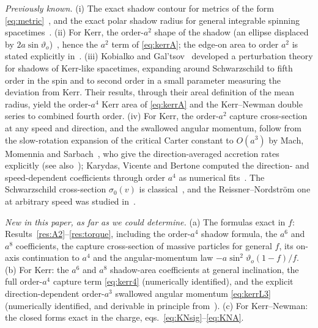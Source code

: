 \documentclass[11pt,a4paper]{article}
\theoremstyle{remark}
\numberwithin{equation}{section}
\begin{document}
\emph{Previously known.}
(i) The exact shadow contour for metrics of the form \eqref{eq:metric}~\cite{Tsukamoto2018,Shaikh2019},
and the exact polar shadow radius for general integrable spinning spacetimes~\cite{Salehi2024}.
(ii) For Kerr, the order-$a^2$ shape of the shadow (an ellipse displaced by $2a\sin\vartheta_o$)~\cite{Bozza2006,GrallaLupsasca2020shape,PerlickTsupko2022},
hence the $a^2$ term of \eqref{eq:kerrA}; the edge-on area to order $a^2$ is stated explicitly in~\cite{Hassanabadi2026}.
(iii) Kobialko and Gal'tsov~\cite{KobialkoGaltsov2026} developed a perturbation theory for shadows of Kerr-like spacetimes,
expanding around Schwarzschild to fifth order in the spin and to second order in a small parameter measuring the deviation from Kerr.
Their results, through their areal definition of the mean radius, yield the order-$a^4$ Kerr area of \eqref{eq:kerrA} and the
Kerr--Newman double series to combined fourth order.
(iv) For Kerr, the order-$a^2$ capture cross-section at any speed and direction, and the swallowed angular momentum, follow
from the slow-rotation expansion of the critical Carter constant to $O(a^3)$ by Mach, Momennia and Sarbach~\cite{MachMomenniaSarbach2026},
who give the direction-averaged accretion rates explicitly (see also~\cite{MachMomenniaSarbach2026b}); Karydas, Vicente and Bertone
computed the direction- and speed-dependent coefficients through order $a^4$ as numerical fits~\cite{Karydas2026}. The
Schwarzschild cross-section $\sigma_0(v)$ is classical~\cite{Unruh1976}, and the Reissner--Nordstr\"om one at arbitrary speed was
studied in~\cite{Benone2014}.

\emph{New in this paper, as far as we could determine.}
(a) The formulas exact in $f$: Results~\ref{res:A2}--\ref{res:torque}, including the order-$a^4$ shadow formula, the
$a^6$ and $a^8$ coefficients, the capture cross-section of massive particles for general $f$, its on-axis continuation to
$a^4$ and the angular-momentum law $-a\sin^2\vartheta_o(1-f)/f$.
(b) For Kerr: the $a^6$ and $a^8$ shadow-area coefficients at general inclination, the full order-$a^4$ capture term
\eqref{eq:kerr4} (numerically identified), and the explicit direction-dependent order-$a^3$ swallowed angular momentum
\eqref{eq:kerrL3} (numerically identified, and derivable in principle from~\cite{MachMomenniaSarbach2026}).
(c) For Kerr--Newman: the closed forms exact in the charge, eqs.~\eqref{eq:KNsig}--\eqref{eq:KNA}.
\end{document}
